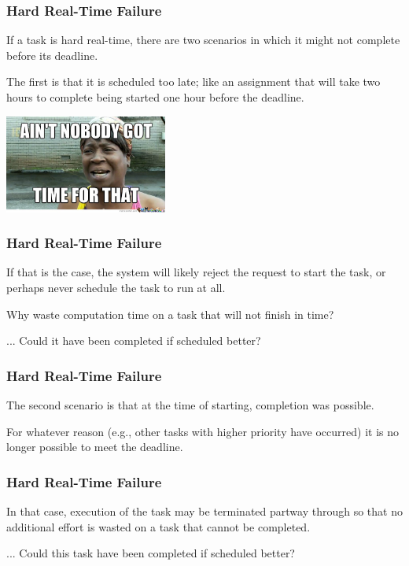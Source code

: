 \begin{frame}
\frametitle{Hard Real-Time Failure}

If a task is hard real-time, there are two scenarios in which it might not complete before its deadline. 

The first is that it is scheduled too late; like an assignment that will take two hours to complete being started one hour before the deadline. 

\begin{center}
	\includegraphics[width=0.4\textwidth]{images/notime.jpg}
\end{center}

\end{frame}

\begin{frame}
\frametitle{Hard Real-Time Failure}

If that is the case, the system will likely reject the request to start the task, or perhaps never schedule the task to run at all. 

Why waste computation time on a task that will not finish in time? 

... Could it have been completed if scheduled better?

\end{frame}

\begin{frame}
\frametitle{Hard Real-Time Failure}

The second scenario is that at the time of starting, completion was possible. 

For whatever reason (e.g., other tasks with higher priority have occurred) it is no longer possible to meet the deadline. 

\end{frame}

\begin{frame}
\frametitle{Hard Real-Time Failure}

In that case, execution of the task may be terminated partway through so that no additional effort is wasted on a task that cannot be completed.

... Could this task have been completed if scheduled better?

\end{frame}

